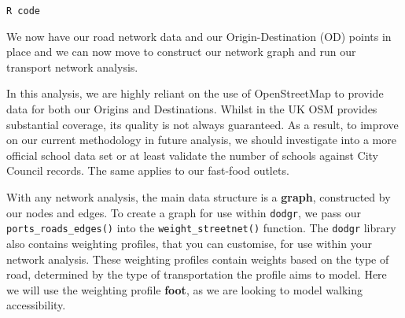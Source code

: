 \documentclass[
  letterpaper,
  DIV=11,
  numbers=noendperiod]{scrreprt}
\newenvironment{Shaded}{\begin{snugshade}}{\end{snugshade}}
\newcommand{\CommentTok}[1]{\textcolor[rgb]{0.37,0.37,0.37}{#1}}
\newcommand{\FunctionTok}[1]{\textcolor[rgb]{0.28,0.35,0.67}{#1}}
\newcommand{\NormalTok}[1]{\textcolor[rgb]{0.00,0.23,0.31}{#1}}
\newcommand{\OtherTok}[1]{\textcolor[rgb]{0.00,0.23,0.31}{#1}}
\newcommand{\SpecialCharTok}[1]{\textcolor[rgb]{0.37,0.37,0.37}{#1}}
\newcommand{\StringTok}[1]{\textcolor[rgb]{0.13,0.47,0.30}{#1}}
\begin{document}
\begin{codelisting}

\caption{\texttt{R code}}

\begin{Shaded}
\end{Shaded}

\end{codelisting}

We now have our road network data and our Origin-Destination (OD) points
in place and we can now move to construct our network graph and run our
transport network analysis.

\begin{tcolorbox}[enhanced jigsaw, rightrule=.15mm, colback=white, opacityback=0, opacitybacktitle=0.6, coltitle=black, colbacktitle=quarto-callout-note-color!10!white, breakable, arc=.35mm, title=\textcolor{quarto-callout-note-color}{\faInfo}\hspace{0.5em}{Note}, left=2mm, leftrule=.75mm, bottomtitle=1mm, toprule=.15mm, bottomrule=.15mm, colframe=quarto-callout-note-color-frame, toptitle=1mm, titlerule=0mm]

In this analysis, we are highly reliant on the use of OpenStreetMap to
provide data for both our Origins and Destinations. Whilst in the UK OSM
provides substantial coverage, its quality is not always guaranteed. As
a result, to improve on our current methodology in future analysis, we
should investigate into a more official school data set or at least
validate the number of schools against City Council records. The same
applies to our fast-food outlets.

\end{tcolorbox}

With any network analysis, the main data structure is a \textbf{graph},
constructed by our nodes and edges. To create a graph for use within
\texttt{dodgr}, we pass our \texttt{ports\_roads\_edges()} into the
\texttt{weight\_streetnet()} function. The \texttt{dodgr} library also
contains weighting profiles, that you can customise, for use within your
network analysis. These weighting profiles contain weights based on the
type of road, determined by the type of transportation the profile aims
to model. Here we will use the weighting profile \textbf{foot}, as we
are looking to model walking accessibility.
\end{document}
